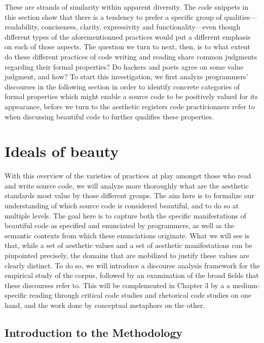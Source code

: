 These are strands of similarity within apparent diversity. The code snippets in this section show that there is a tendency to prefer a specific group of qualities—readability, conciseness, clarity, expressivity and functionality—even though different types of the aforementionned practices would put a different emphasis on each of those aspects. The question we turn to next, then, is to what extent do these different practices of code writing and reading share common judgments regarding their formal properties? Do hackers and poets agree on some value judgment, and how? To start this investigation, we first analyze programmers' discourses in the following section in order to identify concrete categories of formal properties which might enable a source code to be positively valued for its appearance, before we turn to the aesthetic registers code practicionners refer to when discussing beautiful code to further qualifies these properties.

\pagebreak

\section{Ideals of beauty}

With this overview of the varieties of practices at play amongst those who read and write source code, we will analyze more thoroughly what are the aesthetic standards most value by those different groups. The aim here is to formalize our understanding of which source code is considered beautiful, and to do so at multiple levels. The goal here is to capture both the specific manifestations of beautiful code as specified and enunciated by programmers, as well as the semantic contexts from which these enunciations originate. What we will see is that, while a set of aesthetic values and a set of aesthetic manifestations can be pinpointed precisely, the domains that are mobilized to justify these values are clearly distinct. To do so, we will introduce a discourse analysis framework for the empirical study of the corpus, followed by an examination of the broad fields that these discourses refer to. This will be complemented in Chapter 3 by a a medium-specific reading through critical code studies and rhetorical code studies on one hand, and the work done by conceptual metaphors on the other.

\subsection{Introduction to the Methodology}

